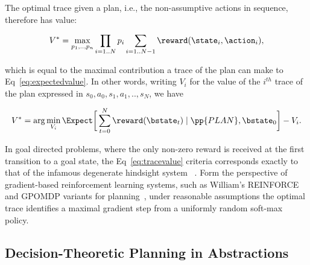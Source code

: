 \noindent The optimal trace given a plan, i.e., the non-assumptive
actions in sequence, therefore has value:

\[
V^* = \max_{p_1, .., p_n} \prod_{i=1..N} p_i \sum_{i=1..N-1}
\reward(\state_i, \action_i),
\]

\noindent which is equal to the maximal contribution a trace of the plan can
make to Eq~\ref{eq:expectedvalue}. In other words, writing $V_i$ for
the value of the $i^{th}$ trace of the plan expressed in $s_0, a_0,
s_1, a_1,.., s_N$, we have

\[
V^* = \arg\min_{V_i} \Expect \bigg{[} 
\sum_{t=0}^{N}  \reward(\bstate_t) \mid \pp{PLAN}, \bstate_0
\bigg{]} - V_i.
\]

In goal directed problems, where the only non-zero reward is received
at the first transition to a goal state, the Eq~\ref{eq:tracevalue}
criteria corresponds exactly to that of the infamous degenerate
hindsight system
~\cite{yoon:etal:2007}. Form the perspective of
gradient-based reinforcement learning systems, such as William's
REINFORCE and GPOMDP variants for planning~\cite{olivier:doug:2009},
under reasonable assumptions the optimal trace identifies a maximal
gradient step from a uniformly random soft-max policy.





\subsection{Decision-Theoretic Planning in Abstractions}

